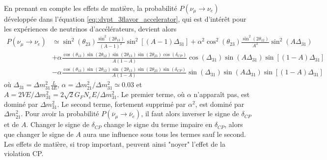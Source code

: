             En prenant en compte les effets de matière, la probabilité $P(\nu_{\mu}\to\nu_e)$ développée dans l'équation \eqref{eq::dvpt_3flavor_accelerator}, qui est d'intérêt pour les expériences de neutrinos d'accélérateurs, devient alors\cite{Giganti2017}
            \begin{equation}\label{eq::proba_matter_3flavors}
	            \begin{split}
	            P(\nu_{\mu}\to\nu_e) & \simeq  \sin^2(\theta_{23})\frac{\sin^2(2\theta_{13})}{(A-1)^2}\sin^2\left[(A-1)\Delta_{31}\right]
	            + \alpha^2\cos^2(\theta_{23})\frac{\sin^2(2\theta_{12})}{A^2}\sin^2\left(A\Delta_{31}\right) \\ 
	            & + \alpha\frac{\cos(\theta_{13})\sin(2\theta_{12})\sin(2\theta_{13})\sin(2\theta_{23})\cos(\delta_{CP})}{A(1-A)}\cos\left(\Delta_{31}\right)\sin\left(A\Delta_{31}\right)\sin\left[(1-A)\Delta_{31}\right] \\
	            & - \alpha\frac{\cos(\theta_{13})\sin(2\theta_{12})\sin(2\theta_{13})\sin(2\theta_{23})\sin(\delta_{CP})}{A(1-A)}\sin\left(\Delta_{31}\right)\sin\left(A\Delta_{31}\right)\sin\left[(1-A)\Delta_{31}\right]
	            \end{split}
            \end{equation}
            où $\Delta_{31}=\Delta m^2_{31}\frac{L}{4E}$, $\alpha=\Delta m^2_{21}/\Delta m^2_{31}\simeq 0.03$  et $A=2VE/\Delta m^2_{31}=2\sqrt{2}G_F N_eE/\Delta m^2_{31}$. Le premier terme, où $\alpha$ n'apparaît pas, est dominé par $\Delta m^2_{31}$. Le second terme, fortement supprimé par $\alpha^2$, est dominé par $\Delta m^2_{21}$. Pour avoir la probabilité $P(\overline{\nu}_{\mu}\to\overline{\nu}_e)$, il faut alors inverser le signe de $\delta_{CP}$ et de $A$. Changer le signe de $\delta_{CP}$ change le signe du terme impaire en $\delta_{CP}$, alors que changer le signe de $A$ aura une influence sous tous les termes sauf le second. Les effets de matière, si trop important, peuvent ainsi "noyer" l'effet de la violation CP.

